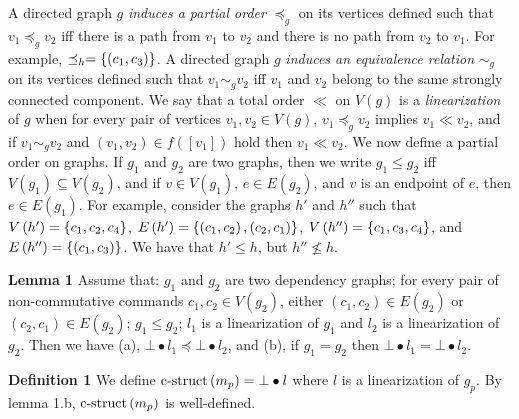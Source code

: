 A directed graph $g$ \emph{induces a partial order} $\preceq_g$ on its vertices defined such that $v_1 \preceq_g v_2$ iff there is a path from $v_1$ to $v_2$ and there is no path from $v_2$ to $v_1$.
For example, $\preceq_h = \left\{\left( c_1,c_3 \right)\right\}$. %
A directed graph $g$ \emph{induces an equivalence relation} $\sim_g$ on its vertices defined such that $v_1 \sim_g v_2$ iff $v_1$ and $v_2$ belong to the same strongly connected component.
We say that a total order $\ll$ on $V\left( g \right)$ is a \emph{linearization} of $g$ when for every pair of vertices $v_1,v_2\in V\left( g \right)$, $v_1 \preceq_g v_2$ implies $v_1 \ll v_2$, and if $v_1 \sim_g v_2$ and $\left( v_1,v_2 \right)\in f\left( \left[ v_1 \right] \right)$ hold then $v_1 \ll v_2$.
We now define a partial order on graphs. If $g_1$ and $g_2$ are two graphs, then we write $g_1 \leq g_2$ iff $V\left( g_1 \right)\subseteq V\left( g_2 \right)$, and if $v\in V\left( g_1 \right)$, $e\in E\left( g_2 \right)$, and $v$ is an endpoint of $e$, then $e\in E\left( g_1 \right)$. 
For example, consider the graphs $h'$ and $h''$ such that $V\left( h' \right)=\left\{c_1,c_2,c_4\right\}$, $E\left( h' \right)=\left\{\left( c_1,c_2 \right),\left( c_2,c_1 \right)\right\}$, $V\left( h'' \right)=\left\{c_1,c_3,c_4\right\}$, and $E\left( h'' \right)=\left\{\left( c_1,c_3 \right)\right\}$. We have that $h'\leq h$, but $ h''\not\leq h$.

\textbf{Lemma 1}
Assume that: $g_1$ and $g_2$ are two dependency graphs; 
for every pair of non-commutative commands $c_1,c_2 \in V\left(g_2\right)$, either $\left( c_1,c_2 \right)\in E\left( g_2 \right)$ or $\left( c_2,c_1 \right)\in E\left( g_2 \right)$;
$g_1 \leq g_2$;
$l_1$ is a linearization of $g_1$ and $l_2$ is a linearization of $g_2$. 
Then we have (a), $\bot\bullet l_1 \preceq \bot\bullet l_2$, and (b), if $g_1 = g_2$ then $\bot\bullet l_1 = \bot\bullet l_2$.

\textbf{Definition 1}
We define $\operatorname{c-struct}\left( m_p \right) = \bot\bullet l$ where $l$ is a linearization of $g_p$.
By lemma 1.b, $\operatorname{c-struct}\left( m_p \right)$ is well-defined.

